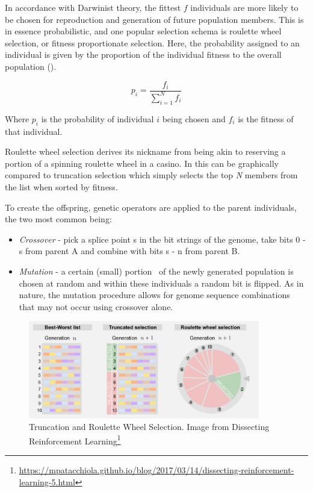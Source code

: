 In accordance with Darwinist theory, the fittest $f$ individuals are more likely to be chosen for reproduction and generation of future population members. This is in essence probabilistic, and one popular selection schema is roulette wheel selection, or fitness proportionate selection. Here, the probability assigned to an individual is given by the proportion of the individual fitness to the overall population ().

\begin{equation}
\label{eq:roulette}	
p_{i}=\frac{f_{i}}{\sum_{i=1}^{N}f_{i}}
\end{equation}

Where $p_i$ is the probability of individual $i$ being chosen and $f_i$ is the fitness of that individual.

Roulette wheel selection derives its nickname from being akin to reserving a portion of a spinning roulette wheel in a casino. In  this can be graphically compared to truncation selection which simply selects the top \textit{N} members from the list when sorted by fitness.

To create the offspring, genetic operators are applied to the parent individuals, the two most common being:
\begin{itemize}
	\item \textit{Crossover} - pick a splice point s in the bit strings of the genome, take bits 0 - s from parent A and combine with bits s - n from parent B.

	\item \textit{Mutation} - a certain (small) portion \ of the newly generated population is chosen at random and within these individuals a random bit is flipped. As in nature, the mutation procedure allows for genome sequence combinations that may not occur using crossover alone.
\end{itemize}

\begin{figure}
	\begin{center}
		\includegraphics[width=0.9\textwidth]{ch03_symbolic/figures/selection.png}
	\end{center}
	\caption[Truncation and Roulette Wheel Selection]{Truncation and Roulette Wheel Selection. Image from Dissecting Reinforcement Learning\footnote{\url{https://mpatacchiola.github.io/blog/2017/03/14/dissecting-reinforcement-learning-5.html}} }
	\label{fig:roulette}
\end{figure}

